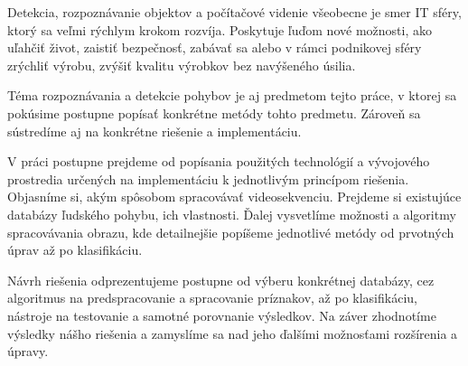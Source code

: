 Detekcia, rozpoznávanie objektov a počítačové videnie všeobecne  je smer IT sféry, ktorý sa veľmi rýchlym krokom rozvíja. Poskytuje ľuďom nové možnosti, ako uľahčiť život, zaistiť bezpečnosť, zabávať sa alebo v rámci podnikovej sféry zrýchliť výrobu, zvýšiť kvalitu výrobkov bez navýšeného úsilia. 

Téma rozpoznávania a detekcie pohybov je aj predmetom tejto práce, v ktorej sa pokúsime postupne popísať konkrétne metódy tohto predmetu. Zároveň sa sústredíme aj na konkrétne riešenie a implementáciu. 

V práci postupne prejdeme od popísania použitých technológií a vývojového prostredia určených na implementáciu k jednotlivým princípom riešenia. Objasníme si, akým spôsobom spracovávať videosekvenciu. Prejdeme si existujúce databázy ľudského pohybu, ich vlastnosti. Ďalej vysvetlíme možnosti a algoritmy spracovávania obrazu, kde detailnejšie popíšeme jednotlivé metódy od prvotných úprav až po klasifikáciu. 

Návrh riešenia odprezentujeme postupne od výberu konkrétnej databázy, cez algoritmus na predspracovanie a spracovanie príznakov, až po klasifikáciu, nástroje na testovanie a samotné porovnanie výsledkov. Na záver zhodnotíme výsledky nášho riešenia a zamyslíme sa nad jeho ďalšími možnosťami rozšírenia a úpravy.
